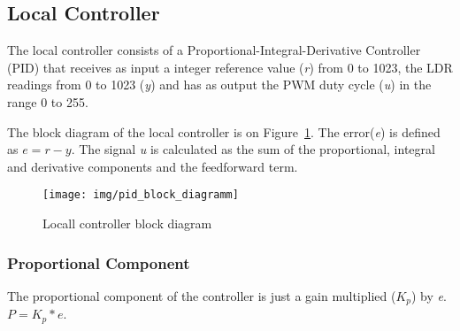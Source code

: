 

\subsection{Local Controller}
\label{sec:LocalController}

The local controller consists of a Proportional-Integral-Derivative Controller (PID) that receives as input a integer reference value (\emph{r}) from 0 to 1023, the LDR readings from 0 to 1023 (\emph{y}) and has as output the PWM duty cycle (\emph{u}) in the range 0 to 255.

The block diagram of the local controller is on Figure~\ref{fig:pid_block_diagramm}. The error(\emph{e}) is defined as $e = r - y$. The signal \emph{u} is calculated as the sum of the proportional, integral and derivative components and the feedforward term.

\begin{figure}[!h]
	\centering
		\texttt{[image: img/pid\_block\_diagramm]}
	\caption{Locall controller block diagram}\label{fig:pid_block_diagramm}
\end{figure}


\subsubsection{Proportional Component}
\label{sub:ProportionalComponent}

The proportional component of the controller is just a gain multiplied (\emph{$K_p$}) by \emph{e}. $ P = K_p * e$.

